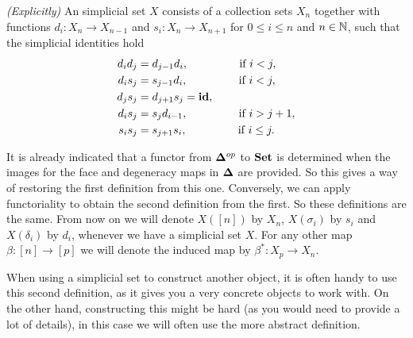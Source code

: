 \begin{definition}
	\emph{(Explicitly)} An simplicial set $X$ consists of a collection sets $X_n$ together with functions $d_i : X_n \to X_{n-1}$ and $s_i : X_n \to X_{n+1}$ for $0 \leq i \leq n$ and $n \in \mathbb{N}$, such that the simplicial identities hold
	\begin{align}
		d_i d_j &= d_{j-1} d_i,  \hspace{1.5cm} \text{ if } i < j,\\
		d_i s_j &= s_{j-1} d_i,  \hspace{1.5cm} \text{ if } i < j,\\
		d_j s_j &= d_{j+1} s_j = \mathbf{id},\\
		d_i s_j &= s_j d_{i-1},  \hspace{1.5cm} \text{ if } i > j+1,\\
		s_i s_j &= s_{j+1} s_i,  \hspace{1.5cm} \text{ if } i \leq j.
	\end{align}
\end{definition}

It is already indicated that a functor from $\mathbf{\Delta}^{op}$ to $\mathbf{Set}$ is determined when the images for the face and degeneracy maps in $\mathbf{\Delta}$ are provided. So this gives a way of restoring the first definition from this one. Conversely, we can apply functoriality to obtain the second definition from the first. So these definitions are the same. From now on we will denote $X([n])$ by $X_n$, $X(\sigma_i)$ by $s_i$ and $X(\delta_i)$ by $d_i$, whenever we have a simplicial set $X$. For any other map $\beta : [n] \to [p]$ we will denote the induced map by $\beta^\ast : X_p \to X_n$.

When using a simplicial set to construct another object, it is often handy to use this second definition, as it gives you a very concrete objects to work with. On the other hand, constructing this might be hard (as you would need to provide a lot of details), in this case we will often use the more abstract definition.

